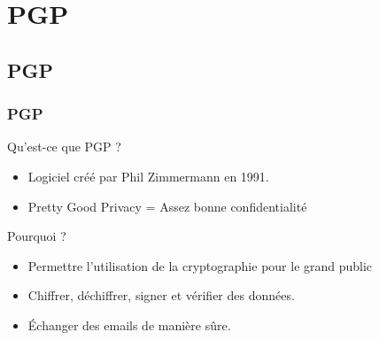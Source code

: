 \section{PGP}
\subsection{PGP}
\begin{frame}
    \frametitle{\color{white}PGP}
    \begin{block}{Qu'est-ce que PGP ?}
      \begin{itemize}
       \item Logiciel créé par Phil Zimmermann en 1991.
         \item Pretty Good Privacy = Assez bonne confidentialité
       \end{itemize} 
    \end{block}
    \begin{block}{Pourquoi ?}
      \begin{itemize}
         \item Permettre l'utilisation de la cryptographie pour le grand public
         \item Chiffrer, déchiffrer, signer et vérifier des données. 
         \item Échanger des emails de manière sûre.
       \end{itemize} 
    \end{block}
\end{frame}
